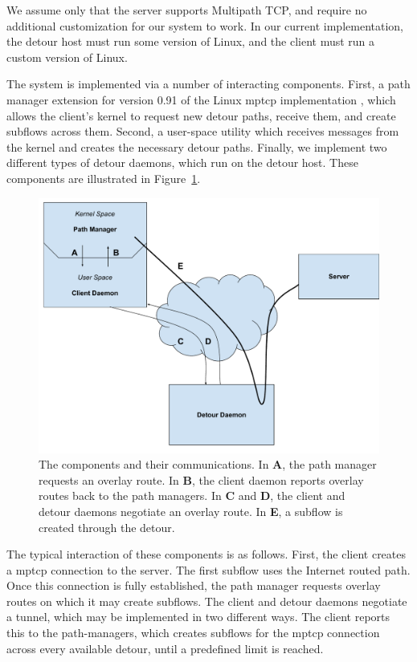 \documentclass{cwru}
\begin{document}
We assume only that the server supports Multipath TCP, and require no additional
customization for our system to work. In our current implementation, the detour
host must run some version of Linux, and the client must run a custom version of
Linux.

The system is implemented via a number of interacting components. First, a path
manager extension for version 0.91 of the Linux \ac{mptcp} implementation
\cite{mptcp}, which allows the client's kernel to request new detour paths,
receive them, and create subflows across them. Second, a user-space utility
which receives messages from the kernel and creates the necessary detour paths.
Finally, we implement two different types of detour daemons, which run on the
detour host. These components are illustrated in Figure~\ref{f:MovingParts}.

\begin{figure}[h]
  \centering
  \includegraphics[width=\textwidth]{figures/MovingParts.pdf}
  \caption[Interaction of client, detour, and server]{
    The components and their communications. In \textbf{A}, the path manager
    requests an overlay route. In \textbf{B}, the client daemon reports overlay
    routes back to the path managers. In \textbf{C} and \textbf{D}, the client
    and detour daemons negotiate an overlay route. In \textbf{E}, a subflow is
    created through the detour.
  }
  \label{f:MovingParts}
\end{figure}

The typical interaction of these components is as follows. First, the client
creates a \ac{mptcp} connection to the server. The first subflow uses the Internet
routed path. Once this connection is fully established, the path manager
requests overlay routes on which it may create subflows. The client and detour
daemons negotiate a tunnel, which may be implemented in two different ways. The
client reports this to the path-managers, which creates subflows for the \ac{mptcp}
connection across every available detour, until a predefined limit is reached.
\end{document}
